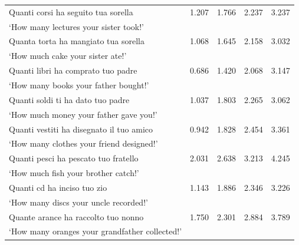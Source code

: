 \documentclass[output=paper]{langsci/langscibook}
\begin{document}
\begin{table}
{\begin{tabular}{lrrrr}
Quanti corsi ha seguito tua sorella                            & 1.207  &  1.766         & 2.237         & 3.237         \\
`How many lectures your sister took!’                          &        &                &               &               \\
Quanta torta ha mangiato tua sorella                           & 1.068  &  1.645         & 2.158         & 3.032         \\
`How much cake your sister ate!’                               &        &                &               &               \\
Quanti libri ha comprato tuo padre                             & 0.686  &  1.420         & 2.068         & 3.147         \\
`How many books your father bought!’                           &        &                &               &               \\
Quanti soldi ti ha dato tuo padre                              & 1.037  &  1.803         & 2.265         & 3.062         \\
`How much money your father gave you!’                         &        &                &               &               \\
Quanti vestiti ha disegnato il tuo amico                       & 0.942  &  1.828         & 2.454         & 3.361         \\
`How many clothes your friend designed!’                       &        &                &               &               \\
Quanti pesci ha pescato tuo fratello                           & 2.031  &  2.638         & 3.213         & 4.245         \\
`How much fish your brother catch!’                            &        &                &               &               \\
Quanti cd ha inciso tuo zio                                    & 1.143  &  1.886         & 2.346         & 3.226         \\
`How many discs your uncle recorded!’                          &        &                &               &               \\
Quante arance ha raccolto tuo nonno                            & 1.750  &  2.301         & 2.884         & 3.789         \\
`How many oranges your grandfather collected!’                 &        &                &               &               \\

\end{tabular}}
\end{table}
\end{document}
